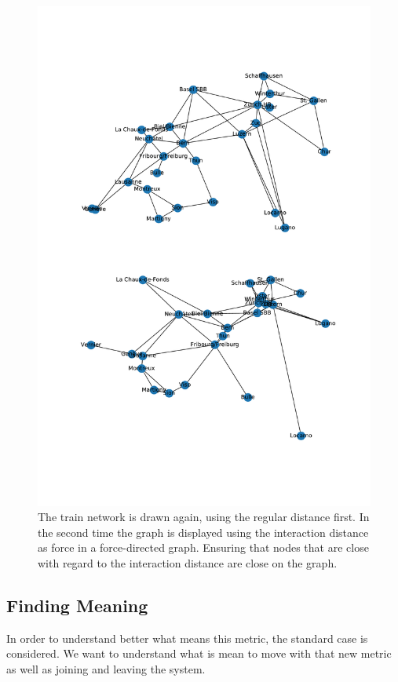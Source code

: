 \documentclass[a4paper,11pt,oneside]{report}
\begin{document}
\begin{figure}[!h] 
\centering
\includegraphics[width=350pt]{figures/CFF-NewDistances}
\caption{The train network is drawn again, using the regular distance first. In the second time the graph is displayed using the interaction distance as force in a force-directed graph. Ensuring that nodes that are close with regard to the interaction distance are close on the graph.}
\label{fig:CFF-NewDistances}
\end{figure}


\subsection{Finding Meaning}
In order to understand better what means this metric, the standard case is
considered. We want to understand what is mean to move with that new metric as
well as joining and leaving the system. 
\end{document}
